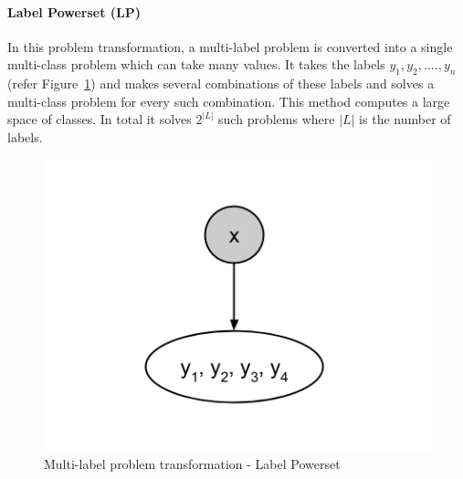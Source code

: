\paragraph{Label Powerset (LP)} 
In this problem transformation, a multi-label problem is converted into a single multi-class problem which can take many values. It takes the labels $y_1, y_2, ...., y_n$ (refer Figure~\ref{fig:LP}) and makes several combinations of these labels and solves a multi-class problem for every such combination. This method computes a large space of classes. In total it solves $2^{|L|}$ such problems where $|L|$ is the number of labels. 
\begin{figure}[!htb]
    \centering
    \includegraphics[scale=0.5]{Figures/LabelPowerset.png}
    \caption{Multi-label problem transformation - Label Powerset}
    \label{fig:LP}
\end{figure}

